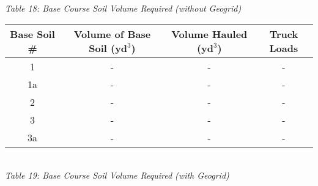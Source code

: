 \documentclass{article}
\begin{document}
\begin{center}
    \emph{\\Table 18: Base Course Soil Volume Required (without Geogrid)\\}
    \vspace{7mm}
    \begin{tabular}{|c|ccc|}
        \hline
        \textbf{Base Soil \#} & \textbf{Volume of Base Soil ($\textbf{yd}^3$)} & \textbf{Volume Hauled ($\textbf{yd}^3$)} & \textbf{Truck Loads}  \\\hline
        1              & -                             & -                      & -           \\
        1a             & -                            & -                       & -           \\
        2              & -                            & -                       & -           \\
        3              & -                            & -                       & -           \\
        3a             & -                            & -                      & -            \\\hline
    \end{tabular}
    \vspace{3mm}
    \emph{\\Table 19: Base Course Soil Volume Required (with Geogrid)\\}


\end{center}
\end{document}
